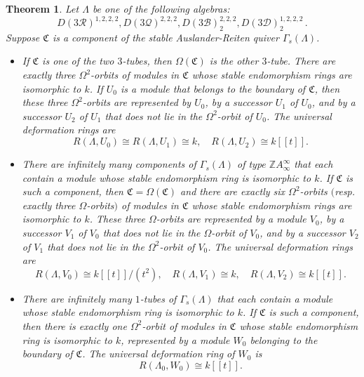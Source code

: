 \documentclass{amsart}
\theoremstyle{plain}
\newtheorem{thm}{Theorem}[subsection]
\theoremstyle{definition}
\theoremstyle{remark}
\begin{document}
\begin{thm}
\label{thm:derivedex2}
Let $\Lambda$ be one of the following algebras:
\begin{equation}
\label{eq:1222}
D(3\mathcal{R})^{1,2,2,2}, D(3\mathcal{Q})^{2,2,2}, D(3\mathcal{B})_2^{2,2,2}, D(3\mathcal{D})_2^{1,2,2,2}\,.
\end{equation}
Suppose $\mathfrak{C}$ is a component of the stable Auslander-Reiten quiver $\Gamma_s(\Lambda)$.
\begin{itemize}
\item[(i)] If $\mathfrak{C}$ is one of the two $3$-tubes, then $\Omega(\mathfrak{C})$ is the 
other $3$-tube. There are exactly three $\Omega^2$-orbits of modules
in $\mathfrak{C}$ whose stable endomorphism rings are isomorphic to $k$. 
If $U_0$ is a module that belongs to the boundary of $\mathfrak{C}$, then these three 
$\Omega^2$-orbits are represented by $U_0$, by a successor $U_1$ of $U_0$, and by a 
successor $U_2$ of $U_1$ that does not lie in the $\Omega^2$-orbit of $U_0$. The universal
deformation rings are 
$$R(\Lambda,U_0)\cong R(\Lambda,U_1)\cong k,\quad R(\Lambda,U_2)\cong k[[t]].$$

\item[(ii)] There are infinitely many components of $\Gamma_s(\Lambda)$ of type $\mathbb{Z}
A_\infty^\infty$ that each contain a module whose stable endomorphism ring is isomorphic to $k$.
If $\mathfrak{C}$ is such a component, then $\mathfrak{C}=\Omega(\mathfrak{C})$ and there
are exactly six  $\Omega^2$-orbits $($resp. exactly three $\Omega$-orbits$)$ of modules 
in $\mathfrak{C}$ whose stable endomorphism rings are isomorphic to $k$. These three $\Omega$-orbits are 
represented by a module $V_0$, by a successor $V_1$ of $V_0$ that does not lie in the $\Omega$-orbit of $V_0$, 
and by a successor $V_2$ of $V_1$ that does not lie in the $\Omega^2$-orbit of $V_0$. 
The universal deformation rings are 
$$R(\Lambda,V_0)\cong k[[t]]/(t^2),\quad R(\Lambda,V_1)\cong k,\quad R(\Lambda,V_2)\cong k[[t]].$$

\item[(iii)] There are infinitely many $1$-tubes of $\Gamma_s(\Lambda)$ that each contain a module 
whose stable endomorphism ring is isomorphic to $k$. If $\mathfrak{C}$ is such a component, 
then there is exactly one $\Omega^2$-orbit of modules in $\mathfrak{C}$ whose stable 
endomorphism ring is isomorphic to $k$, represented by a module $W_0$ belonging to the 
boundary of $\mathfrak{C}$. The universal deformation ring of $W_0$ is 
$$R(\Lambda_0,W_0)\cong k[[t]].$$
\end{itemize}
\end{thm}
\end{document}
